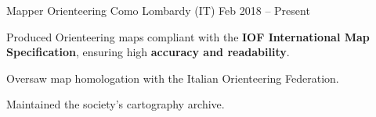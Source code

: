 
\cventry
{Mapper}
{Orienteering Como}
{Lombardy (IT)}
{Feb 2018 -- Present}
{
    \begin{cvitems}
        \item {Produced Orienteering maps compliant with the \textbf{IOF International Map Specification}, ensuring high \textbf{accuracy and readability}.}
        \item {Oversaw map homologation with the Italian Orienteering Federation.}
        \item {Maintained the society's cartography archive.}
    \end{cvitems}
}
